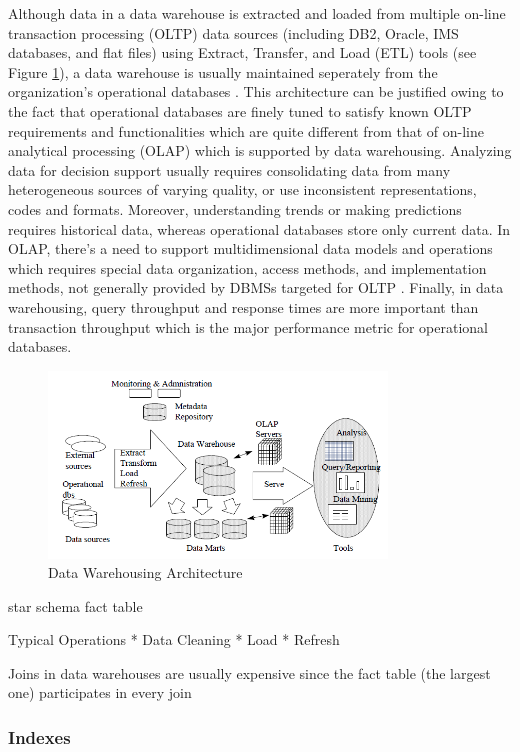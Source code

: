 \documentclass[12pt,a4paper]{article}
\begin{document}
Although data in a data warehouse is extracted and loaded from multiple on-line transaction processing (OLTP) data sources (including DB2, Oracle, IMS databases, and flat files) using Extract, Transfer, and Load (ETL) tools (see Figure \ref{fig:dw}), a data warehouse is usually maintained seperately from the organization's operational databases \cite{sen2005comparison, 248616}. This architecture can be justified owing to the fact that operational databases are finely tuned to satisfy known OLTP requirements and functionalities which are quite different from that of on-line analytical processing (OLAP) which is supported by data warehousing. Analyzing data for decision support usually requires consolidating data from many heterogeneous sources of varying quality, or use inconsistent representations, codes and formats. Moreover, understanding trends or making predictions requires historical data, whereas operational databases store only current data. In OLAP, there's a need to support multidimensional data models and operations which requires special data organization, access methods, and implementation methods, not generally provided by DBMSs targeted for OLTP \cite{248616}. Finally, in data warehousing, query throughput and response times are more important than transaction throughput which is the major performance metric for operational databases.

\begin{figure}[!t]
\centering
\includegraphics[width=9cm]{figs/dw.png}
\caption{Data Warehousing Architecture \cite{248616}}
\label{fig:dw}
\end{figure}



star schema
fact table

Typical Operations
    * Data Cleaning
    * Load
    * Refresh

Joins in data warehouses are usually expensive since the fact table (the largest one) participates in every join \cite{628286}

\subsubsection{Indexes}
\end{document}
